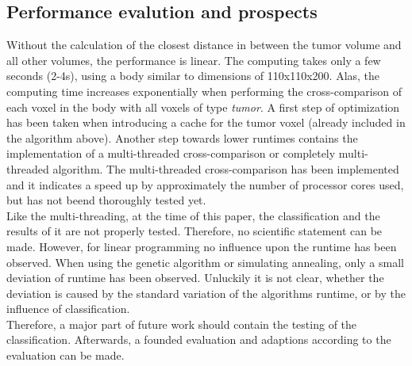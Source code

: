 \subsection{Performance evalution and prospects}
Without the calculation of the closest distance in between the tumor volume and all other volumes, the performance is linear. The computing takes only a few seconds (2-4s), using a body similar to dimensions of 110x110x200. Alas, the computing time increases exponentially when performing the cross-comparison of each voxel in the body with all voxels of type \textit{tumor}. A first step of optimization has been taken when introducing a cache for the tumor voxel (already included in the algorithm above). Another step towards lower runtimes contains the implementation of a multi-threaded cross-comparison or completely multi-threaded algorithm. The multi-threaded cross-comparison has been implemented and it indicates a speed up by approximately the number of processor cores used, but has not beend thoroughly tested yet. \\
Like the multi-threading, at the time of this paper, the classification and the results of it are not properly tested. Therefore, no scientific statement can be made. However, for linear programming no influence upon the runtime has been observed. When using the genetic algorithm or simulating annealing, only a small deviation of runtime has been observed. Unluckily it is not clear, whether the deviation is caused by the standard variation of the algorithms runtime, or by the influence of classification.\\
Therefore, a major part of future work should contain the testing of the classification. Afterwards, a founded evaluation and adaptions according to the evaluation can be made.